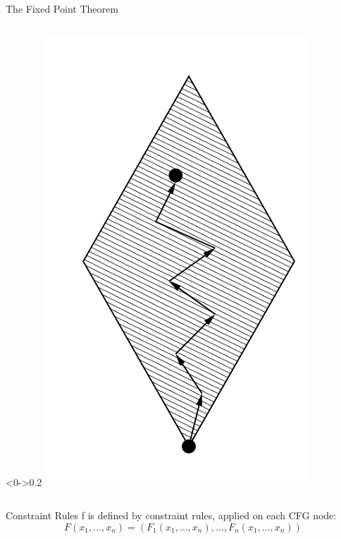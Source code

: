\begin{frame}{The Fixed Point Theorem}
\begin{columns}[c]
    \begin{column}<0->{0.2\textwidth}
      \includegraphics[width=\textwidth]{graphics/fixed-point_walk}
    \end{column}
  \end{columns}
\end{frame}


\begin{frame}{Constraint Rules}{}
  f is defined by constraint rules, applied on each CFG node:
  \[ F(x_1, \dots, x_n) = (F_1(x_1, \dots, x_n), \dots, F_n(x_1, \dots, x_n)) \]
\end{frame}


